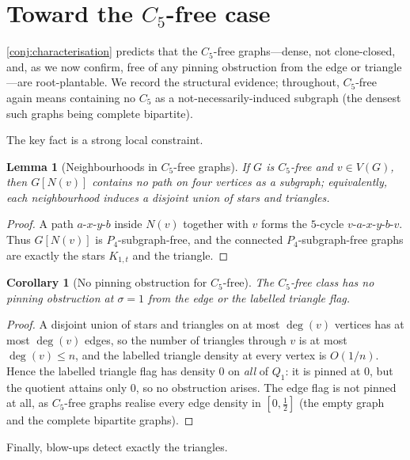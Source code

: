 \documentclass[11pt]{article}
\newtheorem{lemma}[theorem]{Lemma}
\newtheorem{corollary}[theorem]{Corollary}
\theoremstyle{definition}
\begin{document}
\section{Toward the \texorpdfstring{$C_5$}{C5}-free case}

\cref{conj:characterisation} predicts that the $C_5$-free graphs---dense,
not clone-closed, and, as we now confirm, free of any pinning obstruction from the
edge or triangle---are root-plantable.  We record the structural evidence;
throughout, $C_5$-free again means containing no $C_5$ as a not-necessarily-induced
subgraph (the densest such graphs being complete bipartite).

The key fact is a strong local constraint.

\begin{lemma}[Neighbourhoods in $C_5$-free graphs]\label{lem:c5-nbhd}
If $G$ is $C_5$-free and $v\in V(G)$, then $G[N(v)]$ contains no path on four
vertices as a subgraph; equivalently, each neighbourhood induces a disjoint union of
stars and triangles.
\end{lemma}

\begin{proof}
A path $a$-$x$-$y$-$b$ inside $N(v)$ together with $v$ forms the $5$-cycle
$v$-$a$-$x$-$y$-$b$-$v$.  Thus $G[N(v)]$ is $P_4$-subgraph-free, and the connected
$P_4$-subgraph-free graphs are exactly the stars $K_{1,t}$ and the triangle.
\end{proof}

\begin{corollary}[No pinning obstruction for $C_5$-free]\label{cor:c5-no-pin}
The $C_5$-free class has no pinning obstruction at $\sigma=1$ from the edge or the
labelled triangle flag.
\end{corollary}

\begin{proof}
A disjoint union of stars and triangles on at most $\deg(v)$ vertices has at most
$\deg(v)$ edges, so the number of triangles through $v$ is at most $\deg(v)\le n$,
and the labelled triangle density at every vertex is $O(1/n)$.  Hence the
labelled triangle flag has density $0$ on \emph{all} of $Q_1$: it is pinned at $0$, but
the quotient attains only $0$, so no obstruction arises.  The edge flag is not
pinned at all, as $C_5$-free graphs realise every edge density in $[0,\tfrac12]$
(the empty graph and the complete bipartite graphs).
\end{proof}

Finally, blow-ups detect exactly the triangles.
\end{document}
